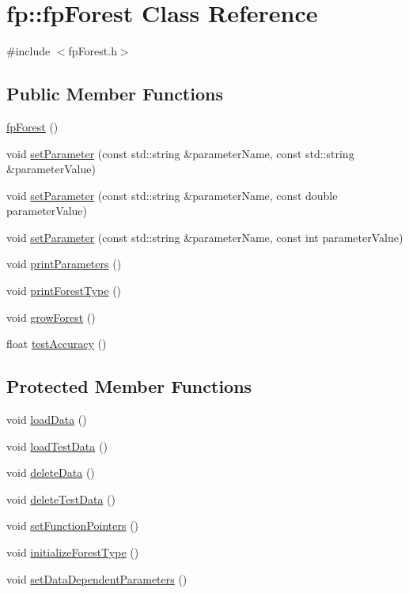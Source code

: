 \hypertarget{classfp_1_1fpForest}{}\section{fp\+:\+:fp\+Forest Class Reference}
\label{classfp_1_1fpForest}


{\ttfamily \#include $<$fp\+Forest.\+h$>$}

\subsection*{Public Member Functions}
\begin{DoxyCompactItemize}
\item 
\hyperlink{classfp_1_1fpForest_a24525268a1b59f78f687db1e0f609a59}{fp\+Forest} ()
\item 
void \hyperlink{classfp_1_1fpForest_ad13bbbd33291ef5f523691eccc23aece}{set\+Parameter} (const std\+::string \&parameter\+Name, const std\+::string \&parameter\+Value)
\item 
void \hyperlink{classfp_1_1fpForest_afc7a14e083aaae0dbd90ef0a30c48c21}{set\+Parameter} (const std\+::string \&parameter\+Name, const double parameter\+Value)
\item 
void \hyperlink{classfp_1_1fpForest_a8a083cc4cd4110dee2b6627d53529965}{set\+Parameter} (const std\+::string \&parameter\+Name, const int parameter\+Value)
\item 
void \hyperlink{classfp_1_1fpForest_ae096def0ca26f0771b27341d7b218066}{print\+Parameters} ()
\item 
void \hyperlink{classfp_1_1fpForest_a4a7ffa92224570d6a97eff8bd5e9b0fa}{print\+Forest\+Type} ()
\item 
void \hyperlink{classfp_1_1fpForest_ac617e33890e96ee5e96e286a45d245fe}{grow\+Forest} ()
\item 
float \hyperlink{classfp_1_1fpForest_a2ecaa11b48f37781f5fb4607ed6a490f}{test\+Accuracy} ()
\end{DoxyCompactItemize}
\subsection*{Protected Member Functions}
\begin{DoxyCompactItemize}
\item 
void \hyperlink{classfp_1_1fpForest_a01631065f4909f10cea4b690084a345a}{load\+Data} ()
\item 
void \hyperlink{classfp_1_1fpForest_abdcf008b65b6af7be5428d838b33be32}{load\+Test\+Data} ()
\item 
void \hyperlink{classfp_1_1fpForest_a598d32c816dfe5f9793973dcdff2f76e}{delete\+Data} ()
\item 
void \hyperlink{classfp_1_1fpForest_a3eb78e4e61b289853cc45021f2cf3de0}{delete\+Test\+Data} ()
\item 
void \hyperlink{classfp_1_1fpForest_ab25fdbad494f8bd358ccb3a1fdbcb51d}{set\+Function\+Pointers} ()
\item 
void \hyperlink{classfp_1_1fpForest_a776ae408ea6c9af459e6ebba7e363d57}{initialize\+Forest\+Type} ()
\item 
void \hyperlink{classfp_1_1fpForest_a846818c46a4423f668f19d3493864192}{set\+Data\+Dependent\+Parameters} ()
\end{DoxyCompactItemize}
